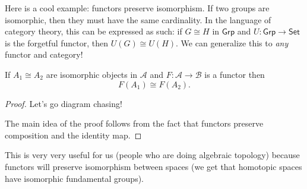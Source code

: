 Here is a cool example: functors preserve isomorphism. If two groups are isomorphic, then they must have the same cardinality. In the language of category theory, this can be expressed as such: if $G\cong H$ in $\mathsf{Grp}$ and $U \colon \mathsf{Grp} \to \mathsf{Set}$ is the forgetful functor, then $U(G)\cong U(H)$. We can generalize this to \emph{any} functor and category!
\begin{theorem}
    If $A_1\cong A_2$ are isomorphic objects in $\mathcal{A}$ and $F \colon \mathcal{A} \to \mathcal{B}$ is a functor then \[
        F(A_1)\cong F(A_2).
    \] 
\end{theorem}
\begin{proof}
Let's go diagram chasing!
            \begin{figure}[H]
                \centering
            \end{figure}
The main idea of the proof follows from the fact that functors preserve composition and the identity map. 
\end{proof}
This is very very useful for us (people who are doing algebraic topology) because functors will preserve isomorphism between spaces (we get that homotopic spaces have isomorphic fundamental groups).
